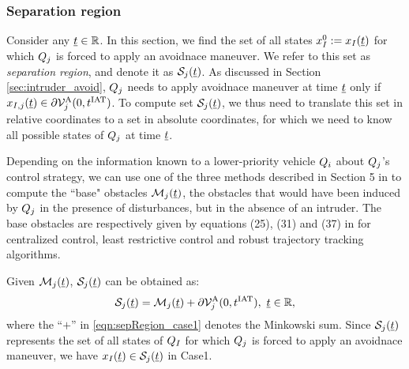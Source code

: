 \subsubsection{Separation region} \label{sec:sepRegion_case1}
Consider any $\underline{t} \in \mathbb{R}$. In this section, we find the set of all states $x_{I}^0 := x_{I}(\underline{t})$ for which $Q_j$ is forced to apply an avoidnace maneuver. We refer to this set as \textit{separation region}, and denote it as $\mathcal{S}_j(\underline{t})$. As discussed in Section \ref{sec:intruder_avoid}, $Q_j$ needs to apply avoidnace maneuver at time $\underline{t}$ only if $x_{I, j}(\underline{t}) \in \partial \mathcal{V}^{\text{A}}_{j}(0, t^\text{IAT})$. To compute set $\mathcal{S}_j(\underline{t})$, we thus need to translate this set in relative coordinates to a set in absolute coordinates, for which we need to know all possible states of $Q_j$ at time $\underline{t}$.

Depending on the information known to a lower-priority vehicle $Q_i$ about $Q_j$'s control strategy, we can use one of the three methods described in Section 5 in \cite{chen2016robust} to compute the ``base" obstacles $\mathcal{M}_j(\underline{t})$, the obstacles that would have been induced by $Q_j$ in the presence of disturbances, but in the absence of an intruder. The base obstacles are respectively given by equations (25), (31) and (37) in \cite{chen2016robust} for centralized control, least restrictive control and robust trajectory tracking algorithms.

Given $\mathcal{M}_j(\underline{t})$, $\mathcal{S}_j(\underline{t})$ can be obtained as:
\begin{equation} \label{eqn:sepRegion_case1}
\sep_j(\tsa) = \boset_j(\tsa) + \partial \brs^{\text{A}}_{j}(0, \iat), ~\tsa \in \R,
\end{equation}
where the ``$+$'' in \eqref{eqn:sepRegion_case1} denotes the Minkowski sum. Since $\mathcal{S}_j(\underline{t})$ represents the set of all states of $Q_I$ for which $Q_j$ is forced to apply an avoidnace maneuver, we have $x_{I}(\underline{t}) \in \mathcal{S}_j(\underline{t})$ in Case1.




